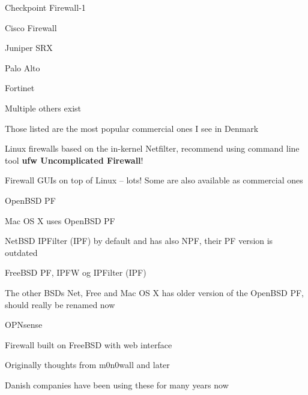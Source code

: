\documentclass[Screen16to9,17pt]{foils}
\begin{document}
\begin{list2}
\item Checkpoint Firewall-1 
\item Cisco Firewall 
\item Juniper SRX 
\item Palo Alto 
\item Fortinet 
\item Multiple others exist
\end{list2}

Those listed are the most popular commercial ones I see in Denmark


\begin{list2}
\item Linux firewalls based on the in-kernel Netfilter, recommend using command line tool {\bf ufw Uncomplicated Firewall}!
\item Firewall GUIs on top of Linux -- lots! Some are also available as commercial ones
\item OpenBSD PF
\item Mac OS X uses OpenBSD PF
\item NetBSD IPFilter (IPF) by default and has also NPF, their PF version is outdated
\item FreeBSD PF, IPFW og IPFilter (IPF) 
\item The other BSDs Net, Free and Mac OS X has older version of the OpenBSD PF, should really be renamed now
\end{list2}



\begin{list1}
\item OPNsense 
\item Firewall built on FreeBSD with web interface
\item Originally thoughts from m0n0wall and later \\
\item Danish companies have been using these for many years now
\end{list1}
\end{document}
